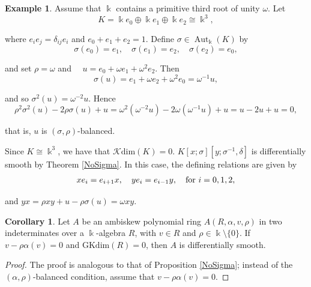 \documentclass{amsart}
\theoremstyle{definition}
\newtheorem{corollary}[theorem]{Corollary}
\newtheorem{example}[theorem]{Example}
\theoremstyle{remark}
\numberwithin{equation}{section}
\begin{document}
\begin{example}\label{semiambi}
Assume that $\Bbbk$ contains a primitive third root of unity $\omega$. Let
\[
K=\Bbbk e_0\oplus \Bbbk e_1\oplus \Bbbk e_2\cong \Bbbk^3,
\]

where $e_i e_j = \delta_{ij}e_i$ and $e_0 + e_1 + e_2 = 1$. Define $\sigma\in\operatorname{Aut}_{\Bbbk}(K)$ by
\[
\sigma(e_0) = e_1, \quad \sigma(e_1) = e_2, \quad \sigma(e_2)=e_0,
\]

and set $\rho = \omega$ and $\quad u = e_0 + \omega e_1 + \omega^2 e_2$. Then
\[
\sigma(u)=e_1+\omega e_2+\omega^2 e_0=\omega^{-1}u,
\]

and so $\sigma^2(u)=\omega^{-2}u$. Hence
\[
\rho^2\sigma^2(u)-2\rho\sigma(u)+u
=\omega^2(\omega^{-2}u)-2\omega(\omega^{-1}u)+u
=u-2u+u=0,
\]

that is, $u$ is $(\sigma,\rho)$-balanced.

Since $K\cong\Bbbk^3$, we have that $\mathcal{K}\mathrm{dim}(K)=0$. $K[x;\sigma][y;\sigma^{-1},\delta]$ is differentially smooth by Theorem \ref{NoSigma}. In this case, the defining relations are given by 
\[
xe_i = e_{i+1}x, \quad ye_i = e_{i-1}y, \quad {\rm for} \ i = 0,1,2,
\]

and $yx=\rho xy+u-\rho\sigma(u) = \omega xy$. 
\end{example}

\begin{corollary}\label{Cor37}
Let $A$ be an ambiskew polynomial ring $A(R, \alpha, v, \rho)$ in two indeterminates over a $\Bbbk$-algebra $R$, with $v\in R$ and $\rho\in\Bbbk\setminus\{0\}$. If $v-\rho\alpha(v)=0$ and $\text{GKdim}(R)=0$, then $A$ is differentially smooth.
\end{corollary}
\begin{proof}
The proof is analogous to that of Proposition \ref{NoSigma}; instead of the $(\alpha,\rho)$-balanced condition, assume that $v-\rho\alpha(v)=0$.
\end{proof}
\end{document}
